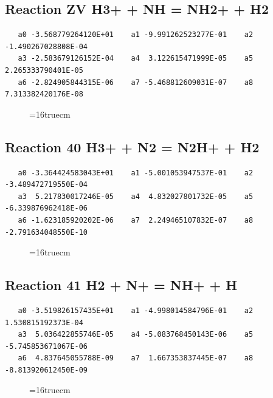 \documentclass[12pt]{article}
\begin{document}
\subsection{
Reaction ZV H3+ + NH = NH2+ + H2}
\begin{small}\begin{verbatim}
   a0 -3.568779264120E+01    a1 -9.991262523277E-01    a2 -1.490267028808E-04
   a3 -2.583679126152E-04    a4  3.122615471999E-05    a5  2.265333790401E-05
   a6 -2.824905844315E-06    a7 -5.468812609031E-07    a8  7.313382420176E-08
   \end{verbatim}\end{small}
\begin{figure}[h!] \label{n2rates}
\epsfxsize=16truecm
\end{figure}
\newpage

\subsection{
Reaction 40 H3+ + N2 = N2H+ + H2}
\begin{small}\begin{verbatim}
   a0 -3.364424583043E+01    a1 -5.001053947537E-01    a2 -3.489472719550E-04
   a3  5.217830017246E-05    a4  4.832027801732E-05    a5 -6.339876962418E-06
   a6 -1.623185920202E-06    a7  2.249465107832E-07    a8 -2.791634048550E-10
   \end{verbatim}\end{small}
\begin{figure}[h!] \label{n2rates}
\epsfxsize=16truecm
\end{figure}
\newpage

\subsection{
Reaction 41 H2 + N+ = NH+ + H}
\begin{small}\begin{verbatim}
   a0 -3.519826157435E+01    a1 -4.998014584796E-01    a2  1.530815192373E-04
   a3  5.036422855746E-05    a4 -5.083768450143E-06    a5 -5.745853671067E-06
   a6  4.837645055788E-09    a7  1.667353837445E-07    a8 -8.813920612450E-09
   \end{verbatim}\end{small}
\begin{figure}[h!] \label{n2rates}
\epsfxsize=16truecm
\end{figure}
\newpage
\end{document}
